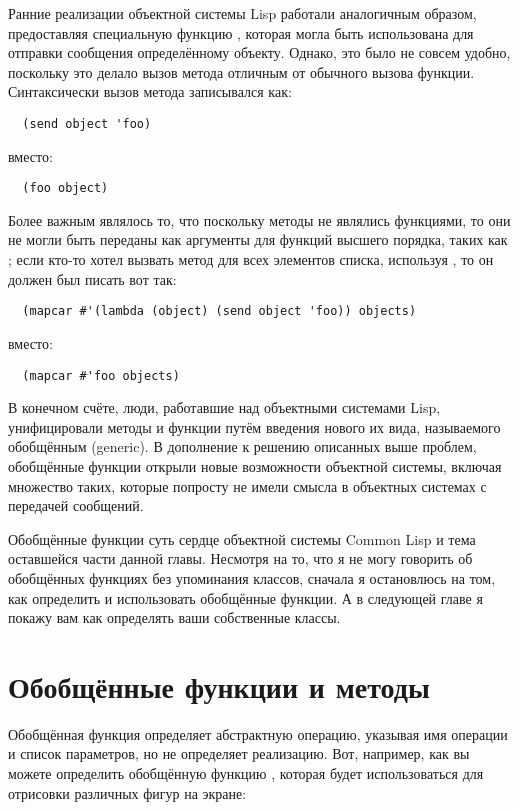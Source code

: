 Ранние реализации объектной системы Lisp работали аналогичным образом, предоставляя
специальную функцию , которая могла быть использована для отправки сообщения
определённому объекту.  Однако, это было не совсем удобно, поскольку это делало вызов
метода отличным от обычного вызова функции.  Синтаксически вызов метода записывался как:

\begin{lstlisting}
  (send object 'foo)
\end{lstlisting}

вместо:

\begin{lstlisting}
  (foo object)
\end{lstlisting}

Более важным являлось то, что поскольку методы не являлись функциями, то они не могли быть
переданы как аргументы для функций высшего порядка, таких как ; если кто-то
хотел вызвать метод для всех элементов списка, используя , то он должен был
писать вот так:

\begin{lstlisting}
  (mapcar #'(lambda (object) (send object 'foo)) objects)
\end{lstlisting}

вместо:

\begin{lstlisting}
  (mapcar #'foo objects)
\end{lstlisting}

В конечном счёте, люди, работавшие над объектными системами Lisp, унифицировали методы и
функции путём введения нового их вида, называемого обобщённым (generic).  В дополнение к
решению описанных выше проблем, обобщённые функции открыли новые возможности объектной
системы, включая множество таких, которые попросту не имели смысла в объектных системах с
передачей сообщений.

Обобщённые функции суть сердце объектной системы Common Lisp и тема оставшейся части
данной главы.  Несмотря на то, что я не могу говорить об обобщённых функциях без
упоминания классов, сначала я остановлюсь на том, как определить и использовать обобщённые
функции.  А в следующей главе я покажу вам как определять ваши собственные классы.

\section{Обобщённые функции и методы}

Обобщённая функция определяет абстрактную операцию, указывая имя операции и список
параметров, но не определяет реализацию.  Вот, например, как вы можете определить
обобщённую функцию , которая будет использоваться для отрисовки различных фигур
на экране:

